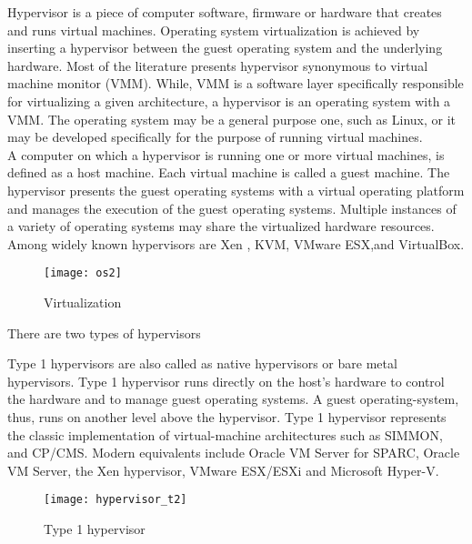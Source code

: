 Hypervisor is a piece of computer software, firmware or hardware that creates and runs virtual machines. Operating system virtualization is achieved by inserting a hypervisor between the guest operating system and the underlying hardware. Most of the literature presents hypervisor synonymous to virtual machine monitor (VMM). While, VMM is a software layer specifically responsible for virtualizing a given architecture, a hypervisor is an operating system with a VMM. The operating system may be a general purpose one, such as Linux, or it may be developed specifically for the purpose of running virtual machines\cite{Agesen:2010:EXV:1899928.1899930}.
\\
A computer on which a hypervisor is running one or more virtual machines, is defined as a host machine. Each virtual machine is called a guest machine. The hypervisor presents the guest operating systems with a virtual operating platform and manages the execution of the guest operating systems. Multiple instances of a variety of operating systems may share the virtualized hardware resources. Among widely known hypervisors are Xen \cite{Barham:2003:XAV:1165389.945462, Chisnall:2007:DGX:1407351}, KVM\cite{Habib:2008:VK:1344209.1344217, kivity07kvm}, VMware ESX\cite{Agesen:2010:EXV:1899928.1899930},and VirtualBox\cite{citeulike:3149886}.
\\
\begin{figure}[!ht]
\centering
\texttt{[image: os2]}
\caption{Virtualization}
\label{fig:Virtualization}
\end{figure}
There are two types of hypervisors \cite{Goldberg:1973:AVM:800122.803950}
\begin{description}
\item Type 1 hypervisors are also called as native hypervisors or bare metal hypervisors. Type 1 hypervisor runs directly on the host's hardware to control the hardware and to manage guest operating systems. A guest operating-system, thus, runs on another level above the hypervisor. Type 1 hypervisor represents the classic implementation of virtual-machine architectures such as SIMMON, and CP/CMS. Modern equivalents include Oracle VM Server for SPARC, Oracle VM Server, the Xen hypervisor\cite{Barham:2003:XAV:1165389.945462}, VMware ESX/ESXi\cite{Agesen:2010:EXV:1899928.1899930} and Microsoft Hyper-V.
\end{description}
\begin{figure}[!ht]
\centering
\texttt{[image: hypervisor\_t2]}
\caption{Type 1 hypervisor}
\label{Type 1 hypervisor}
\end{figure}
